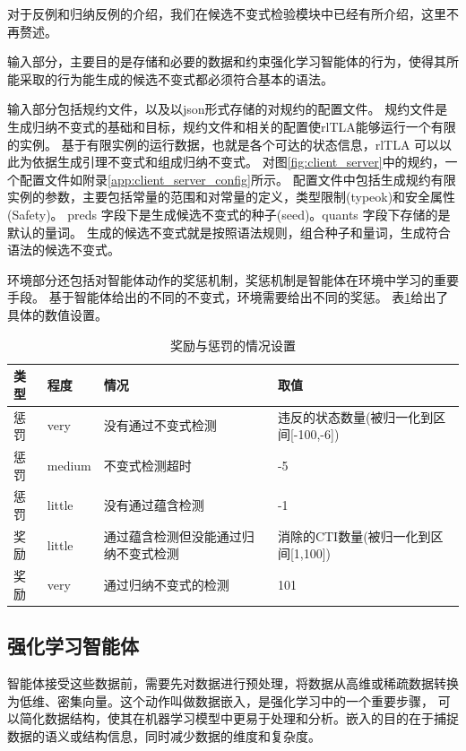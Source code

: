 对于反例和归纳反例的介绍，我们在候选不变式检验模块中已经有所介绍，这里不再赘述。

输入部分，主要目的是存储和必要的数据和约束强化学习智能体的行为，使得其所能采取的行为能生成的候选不变式都必须符合基本的语法。

输入部分包括\TLA 规约文件，以及以json形式存储的对规约的配置文件。
\TLA 规约文件是生成归纳不变式的基础和目标，规约文件和相关的配置使rlTLA能够运行一个有限的实例。
基于有限实例的运行数据，也就是各个可达的状态信息，rlTLA 可以以此为依据生成引理不变式和组成归纳不变式。
对图\ref{fig:client_server}中的规约，一个配置文件如附录\ref{app:client_server_config}所示。
配置文件中包括生成规约有限实例的参数，主要包括常量的范围和对常量的定义，类型限制(typeok)和安全属性(Safety)。
preds 字段下是生成候选不变式的种子(seed)。quants 字段下存储的是默认的量词。
生成的候选不变式就是按照语法规则，组合种子和量词，生成符合语法的候选不变式。

环境部分还包括对智能体动作的奖惩机制，奖惩机制是智能体在环境中学习的重要手段。
基于智能体给出的不同的不变式，环境需要给出不同的奖惩。
表\ref{tab:award_punish}给出了具体的数值设置。
\begin{table}[!htbp]
	\centering
	\caption{奖励与惩罚的情况设置}
	\renewcommand\arraystretch{1.4}
	\begin{tabular}{p{}p{}p{}p{}}
		\toprule
		\textbf{类型}&\textbf{程度}&\textbf{情况}&\textbf{取值}\\
		\midrule
			惩罚&very&没有通过不变式检测&违反的状态数量(被归一化到区间[-100,-6]) \\ 
			惩罚&medium&不变式检测超时&-5\\
            惩罚&little&没有通过蕴含检测&-1\\
            奖励&little&通过蕴含检测但没能通过归纳不变式检测&消除的CTI数量(被归一化到区间[1,100])\\
            奖励&very&通过归纳不变式的检测&101\\
		\bottomrule
	\end{tabular}
        \label{tab:award_punish}
\end{table}

\subsection{强化学习智能体}
智能体接受这些数据前，需要先对数据进行预处理，将数据从高维或稀疏数据转换为低维、密集向量。这个动作叫做数据嵌入，是强化学习中的一个重要步骤，
可以简化数据结构，使其在机器学习模型中更易于处理和分析。嵌入的目的在于捕捉数据的语义或结构信息，同时减少数据的维度和复杂度。

